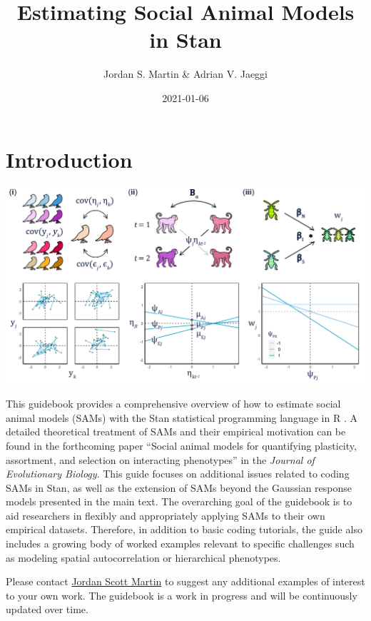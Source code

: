 \documentclass[
]{book}
\title{Estimating Social Animal Models in Stan}
\author{Jordan S. Martin \& Adrian V. Jaeggi}
\date{2021-01-06}
\begin{document}
\maketitle

{
\setcounter{tocdepth}{1}
\tableofcontents
}
\hypertarget{introduction}{%
\chapter*{Introduction}\label{introduction}}

\includegraphics{Fig 1 r1.png}

This guidebook provides a comprehensive overview of how to estimate social animal models (SAMs) with the Stan statistical programming language \citep{Stan} in R \citep{Rbase}. A detailed theoretical treatment of SAMs and their empirical motivation can be found in the forthcoming paper \citep{SAM} ``Social animal models for quantifying plasticity, assortment, and selection on interacting phenotypes'' in the \emph{Journal of Evolutionary Biology}. This guide focuses on additional issues related to coding SAMs in Stan, as well as the extension of SAMs beyond the Gaussian response models presented in the main text. The overarching goal of the guidebook is to aid researchers in flexibly and appropriately applying SAMs to their own empirical datasets. Therefore, in addition to basic coding tutorials, the guide also includes a growing body of worked examples relevant to specific challenges such as modeling spatial autocorrelation or hierarchical phenotypes.

Please contact \href{mailto:jordan.martin@iem.uzh.ch?}{Jordan Scott Martin} to suggest any additional examples of interest to your own work. The guidebook is a work in progress and will be continuously updated over time.
\end{document}
